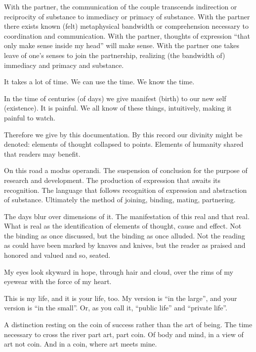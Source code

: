 \break

﻿With the partner, the communication of the couple transcends
indirection or reciprocity of substance to immediacy or primacy of
substance.  With the partner there exists known (felt) metaphysical
bandwidth or comprehension necessary to coordination and
communication.  With the partner, thoughts of expression ``that only
make sense inside my head'' will make sense.  With the partner one
takes leave of one’s senses to join the partnership, realizing (the
bandwidth of) immediacy and primacy and substance.

\break

﻿It takes a lot of time.  We can use the time.  We know the time.

In the time of centuries (of days) we give manifest (birth) to our new
self (existence).  It is painful.  We all know of these things,
intuitively, making it painful to watch.

Therefore we give by this documentation.  By this record our divinity
might be denoted: elements of thought collapsed to points.  Elements
of humanity shared that readers may benefit.

On this road a modus operandi.  The suspension of conclusion for the
purpose of research and development.  The production of expression
that awaits its recognition.  The language that follows recognition of
expression and abstraction of substance.  Ultimately the method of
joining, binding, mating, partnering.

The days blur over dimensions of it.  The manifestation of this real
and that real.  What is real as the identification of elements of
thought, cause and effect.  Not the binding as once discussed, but the
binding as once alluded.  Not the reading as could have been marked by
knaves and knives, but the reader as praised and honored and valued
and so, seated.

\break

﻿My eyes look skyward in hope, through hair and cloud, over the rims of
my eyewear with the force of my heart.

This is my life, and it is your life, too.  My version is ``in the
large'', and your version is ``in the small''.  Or, as you call it,
``public life'' and ``private life''.

A distinction resting on the coin of success rather than the art of
being.  The time necessary to cross the river part art, part coin.  Of
body and mind, in a view of art not coin.  And in a coin, where art
meets mine.


